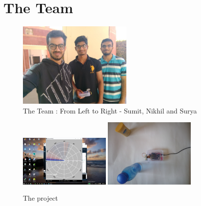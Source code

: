 \chapter{The Team}
\begin{figure}[H]
	\vfill
	\centering
	\includegraphics[width=0.5\textwidth]{../Files/team.jpg}
	\caption{The Team : From Left to Right - Sumit, Nikhil and Surya}  \label{fig:team}
\end{figure}
\begin{figure}[H]
	\vfill
	\centering
	\includegraphics[width=0.4\textwidth]{../Files/project}
	\includegraphics[width=0.4\textwidth]{../Files/project2.jpg}
	\caption{The project}  \label{fig:pro}
\end{figure}